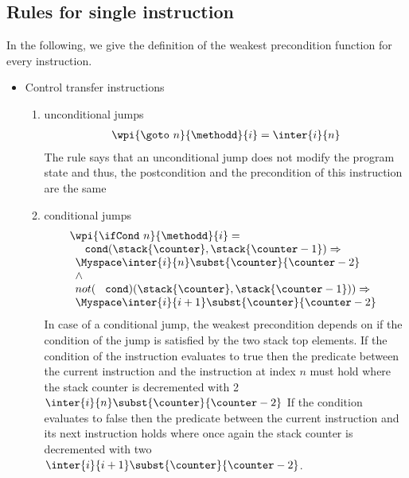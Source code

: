 \subsection{Rules for single instruction}
 In the following, we give the definition of the weakest precondition function for every instruction.


\begin{itemize}	
\item Control transfer instructions
\begin{enumerate}
 \item unconditional jumps \\
  $$\begin{array}{l} \wpi{\goto \  n }{\methodd}{i} =   \inter{i}{n}  \end{array} $$
  The rule says that an unconditional jump does not modify the program state and thus, the postcondition and the precondition of this instruction
  are the same

\item conditional jumps
  $$ \begin{array}{l}
          \wpi{ \ifCond  \  n }{\methodd}{i} =\\
	   \begin{array}{l} 
                  \mbox{ \rm \texttt{ cond}} ( \stack{\counter}, \stack{\counter - 1} ) \Rightarrow \\
                  \Myspace \inter{i}{n}\subst{\counter}{ \counter - 2 } \\
			 \wedge  \\
		  not(\mbox{ \rm \texttt{ cond}})( \stack{\counter},\stack{\counter - 1} ))  \Rightarrow \\
		  \Myspace \inter{i}{i+1}\subst{\counter}{\counter - 2} 
           \end{array}
  \end{array}$$
   In case of a conditional jump, the weakest precondition depends on if  the condition of the jump is satisfied
   by the two stack top elements. %
   If the condition of the instruction evaluates to true then the predicate between the current instruction and
   the instruction at index $n$ must hold  where the stack counter is decremented with 2 $\inter{i}{n}\subst{\counter}{ \counter - 2} $ 
   If the condition evaluates to false then the predicate between the current instruction and its next instruction holds where once again the stack counter
   is decremented with two $ \inter{i}{i+1}\subst{\counter}{\counter - 2} $. 


\end{enumerate}
\end{itemize}
